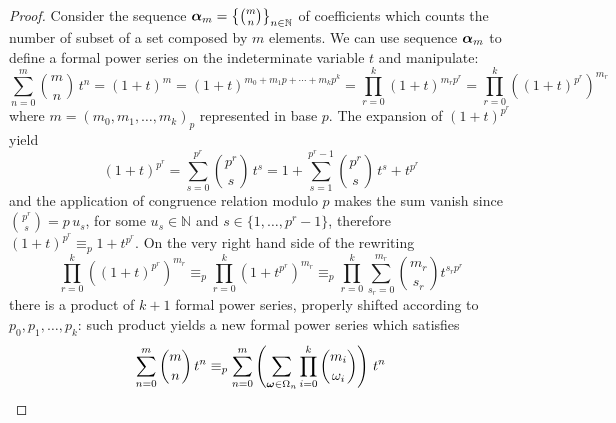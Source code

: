 \begin{proof}
    Consider the sequence $\boldsymbol{\alpha}_{m}=\left\lbrace{{m}\choose{n}}\right\rbrace_{n\in\mathbb{N}}$ 
    of coefficients which counts the number of subset
    of a set composed by $m$ elements. We can use sequence $\boldsymbol{\alpha}_{m}$ to define a 
    formal power series on the indeterminate variable $t$ and manipulate:
    \begin{displaymath}
            \sum_{n=0}^{m}{{{m}\choose{n}}\,t^{n}} %
                = \left(1+t\right)^{m}
                = \left(1+t\right)^{m_{0}+m_{1}p+\cdots+m_{k}p^{k}}%
                = \prod_{r=0}^{k}{{\left(1+t\right)^{m_{r}p^{r}}}}
                = \prod_{r=0}^{k}{\left(\left(1+t\right)^{p^{r}}\right)^{m_{r}}}
    \end{displaymath} where $m=\left(m_{0},m_{1},\ldots,m_{k}\right)_{p}$ represented in 
    base $p$. The expansion of $\left(1+t\right)^{p^{r}}$ yield
    \begin{displaymath}
            \left(1+t\right)^{p^{r}} = \sum_{s=0}^{p^{r}}{{{p^{r}}\choose{s}}\,t^{s}}
                = 1+\sum_{s=1}^{p^{r}-1}{{{p^{r}}\choose{s}}\,t^{s}}+t^{p^{r}}
    \end{displaymath}
    and the application of congruence relation modulo $p$ makes the sum vanish since ${{p^{r}}\choose{s}}=p\,u_{s}$,
    for some $u_{s}\in\mathbb{N}$ and $s\in\lbrace 1,\ldots,p^{r}-1\rbrace$, 
    therefore $\left(1+t\right)^{p^{r}} \equiv_{p} 1+t^{p^{r}}$. On the very right hand side of 
    the rewriting
    \begin{displaymath}
            \prod_{r=0}^{k}{\left(\left(1+t\right)^{p^{r}}\right)^{m_{r}}}
                \equiv_{p} \prod_{r=0}^{k}{\left(1+t^{p^{r}}\right)^{m_{r}}}
                \equiv_{p} \prod_{r=0}^{k}{\sum_{s_{r}=0}^{m_{r}}{{{m_{r}}\choose{s_{r}}}t^{s_{r}p^{r}}}}
    \end{displaymath}
    there is a product of $k+1$ formal power series, properly shifted according to 
    $p_{0},p_{1},\ldots,p_{k}$: such product yields a new formal power series which satisfies
    \begin{displaymath}
        \sum_{n=0}^{m}{{{m}\choose{n}}\,t^{n}} 
        \equiv_{p}
        \sum_{n=0}^{m}{\left(\sum_{\boldsymbol{\omega}\in\Omega_{n}}{\prod_{i=0}^{k}{{{m_{i}}\choose{\omega_{i}}}}}\right)\,t^{n}}
    \end{displaymath}

\end{proof}
